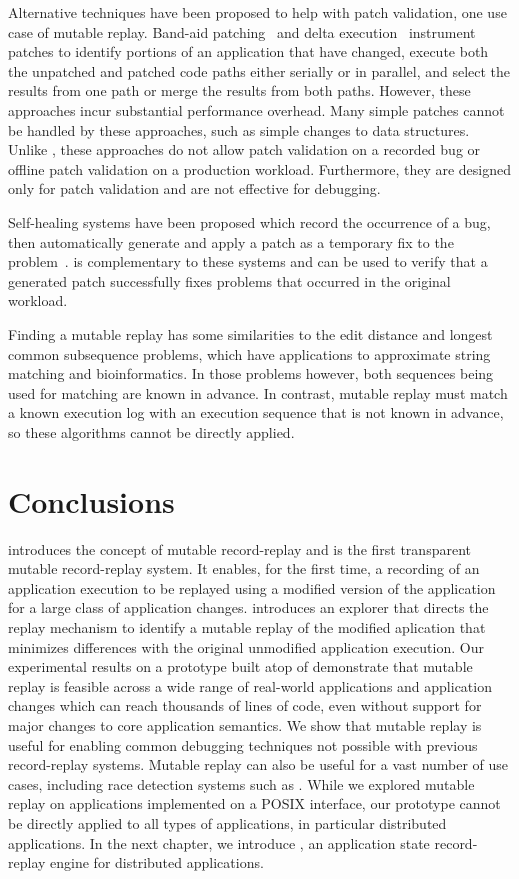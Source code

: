 Alternative techniques have been proposed to help with patch validation, one
use case of mutable replay.
Band-aid
patching~\cite{bandaid} and delta execution~\cite{delta} instrument patches to
identify portions of an application that have changed, execute both
the unpatched and patched code paths either serially or in parallel,
and select the results from one path or merge the results from both
paths. However, these approaches incur substantial performance overhead.
Many simple patches cannot be handled by these
approaches, such as simple changes to data structures. Unlike {\dora},
these approaches do not allow patch validation on a recorded bug or offline
patch validation on a production workload.
Furthermore, they are designed only for patch validation and are not effective for
debugging.

Self-healing systems have been proposed which 
record the occurrence of a bug, then automatically generate and apply
a patch as a temporary fix to the problem~\cite{assure:asplos09}.
{\dora} is complementary
to these systems and can be used to
verify that a generated patch successfully fixes
problems that occurred in the original workload.

Finding a mutable replay has some similarities
to the edit distance and longest common subsequence
problems, which have applications to approximate string matching and
bioinformatics. In those problems however, both
sequences being used for matching are known in advance. In contrast,
mutable replay must match a known execution log with an
execution sequence that is not known in advance, so these algorithms cannot be
directly applied.

\section{Conclusions}
\label{dora:sec:conclusion}

{\dora} introduces the concept of mutable record-replay and is the first
transparent mutable record-replay system.  It enables, for the first time, a
recording of an application execution to be replayed using a modified version of
the application for a large class of application changes.  {\dora} introduces an
explorer that directs the replay mechanism to identify a mutable replay of the
modified aplication that minimizes differences with the original unmodified
application execution.
Our experimental results on a prototype built atop of \scribe demonstrate that
mutable replay is feasible across a wide range of real-world applications and
application changes which can reach thousands of lines of code, even without
support for major changes to core application semantics. We show that mutable
replay is useful for enabling common debugging techniques not possible with
previous record-replay systems. Mutable replay can also be useful for a vast
number of use cases, including race detection systems such as \racepro.
While we explored mutable replay on applications implemented on a POSIX
interface, our \dora prototype cannot be directly applied to all types of
applications, in particular distributed applications. In the next chapter, we
introduce \synapse, an application state record-replay engine for distributed
applications.
